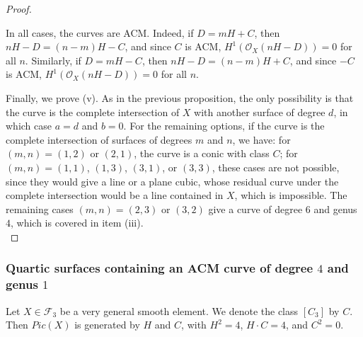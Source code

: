\documentclass[12pt,reqno]{amsart}
\theoremstyle{plain}
\theoremstyle{definition}
\theoremstyle{remark}
\theoremstyle{definition}
\newcommand{\oo}{\mathcal{O}}
\begin{document}
\begin{proof}
\begin{itemize}
    In all cases, the curves are ACM. Indeed, if $D=mH+C$, then
    $nH-D=(n-m)H-C$, and since $C$ is ACM,
    $H^{1}(\oo_{X}(nH-D))=0$ for all $n$.
    Similarly, if $D=mH-C$, then
    $nH-D=(n-m)H+C$, and since $-C$ is ACM,
    $H^{1}(\oo_{X}(nH-D))=0$ for all $n$.
\end{itemize}

Finally, we prove (v). As in the previous proposition, the only possibility is that the curve is the complete intersection of $X$ with another surface of degree $d$, in which case $a=d$ and $b=0$. For the remaining options, if the curve is the complete intersection of surfaces of degrees $m$ and $n$, we have:
for $(m,n)=(1,2)$ or $(2,1)$, the curve is a conic with class $C$;
for $(m,n)=(1,1)$, $(1,3)$, $(3,1)$, or $(3,3)$, these cases are not possible, since they would give a line or a plane cubic, whose residual curve under the complete intersection would be a line contained in $X$, which is impossible.
The remaining cases $(m,n)=(2,3)$ or $(3,2)$ give a curve of degree $6$ and genus $4$, which is covered in item (iii).\\
\end{proof}



\subsubsection{\textbf{Quartic surfaces containing an ACM curve of degree $4$ and genus $1$}}

Let $X\in\mathcal{F}_{3}$ be a very general smooth element. We denote the class $[C_{3}]$ by $C$. Then $Pic(X)$ is generated by $H$ and $C$, with $H^{2}=4$, $H\cdot C=4$, and $C^{2}=0$.
\end{document}
